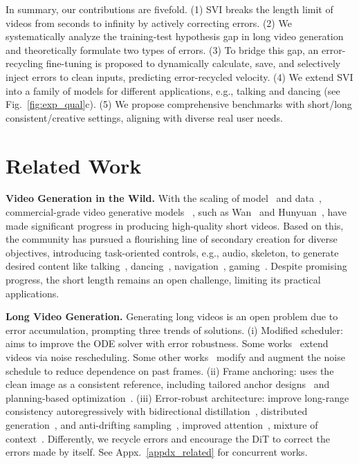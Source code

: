 \documentclass{article} %
\begin{document}
In summary, our contributions are fivefold. (1) SVI breaks the length limit of videos from seconds to infinity by actively correcting errors. (2) We systematically analyze the training-test hypothesis gap in long video generation and theoretically formulate two types of errors. (3) To bridge this gap, an error-recycling fine-tuning is proposed to dynamically calculate, save, and selectively inject errors to clean inputs, predicting error-recycled velocity. (4) We extend SVI into a family of models for different applications, e.g., talking and dancing (see Fig.~\ref{fig:exp_qual}c). (5) We propose comprehensive benchmarks with short/long consistent/creative settings, aligning with diverse real user needs.

\section{Related Work}

\noindent\textbf{Video Generation in the Wild.} With the scaling of model~\citep{hu2024acdit} and data~\citep{weissenborn2020scaling}, commercial-grade video generative models ~\citep{liu2024sora,videoworldsimulators2024,yang2024cogvideox,blattmann2023stable,ho2022video,lin2024open}, such as Wan~\citep{wang2025wan} and Hunyuan~\citep{chen2025hunyuanvideo}, have made significant progress in producing high-quality short videos. Based on this, the community has pursued a flourishing line of secondary creation for diverse objectives, introducing task-oriented controls, e.g., audio, skeleton, to generate desired content like talking~\citep{kong2025let,chen2025hunyuanvideo}, dancing~\citep{wang2025unianimate}, navigation~\citep{agarwal2025cosmos,hassan2025gem}, gaming~\citep{yu2025gamefactory,che2024gamegen}. Despite promising progress, the short length remains an open challenge, limiting its practical applications. 

\noindent\textbf{Long Video Generation.} Generating long videos is an open problem due to error accumulation, prompting three trends of solutions. (i) Modified scheduler: aims to improve the ODE solver with error robustness. Some works~\citep{qiu2024freenoise,hoeg2024streaming} extend videos via noise rescheduling. Some other works~\citep{chen2024diffusion,ruhe2024rolling,songhistory} modify and augment the noise schedule to reduce dependence on past frames. (ii) Frame anchoring: uses the clean image as a consistent reference, including tailored anchor designs~\citep{henschel2025streamingt2v,weng2024art} and planning-based optimization~\citep{videoworldsimulators2024,zhao2024moviedreamer,yang2024synchronized}. (iii) Error-robust architecture: improve long-range consistency autoregressively with bidirectional distillation~\citep{yin2025causvid,huang2025self}, distributed generation~\citep{tan2024video}, and anti-drifting sampling~\citep{zhang2025packing,gu2025long}, improved attention~\cite{kodaira2025streamdit,lu2024freelong}, mixture of context~\citep{cai2025mixture}. 
Differently, we recycle errors and encourage the DiT to correct the errors made by itself. See Appx.~\ref{appdx_related} for concurrent works.
\end{document}
